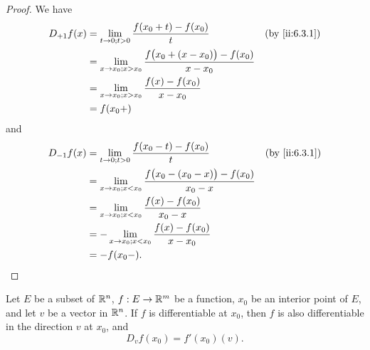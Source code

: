 \begin{proof}
  We have
  \begin{align*}
    D_{+1} f(x) & = \lim_{t \to 0 ; t > 0} \dfrac{f(x_0 + t) - f(x_0)}{t}                           &  & \by{ii:6.3.1} \\
                & = \lim_{x \to x_0 ; x > x_0} \dfrac{f\big(x_0 + (x - x_0)\big) - f(x_0)}{x - x_0}                    \\
                & = \lim_{x \to x_0 ; x > x_0} \dfrac{f(x) - f(x_0)}{x - x_0}                                          \\
                & = f(x_0+)
  \end{align*}
  and
  \begin{align*}
    D_{-1} f(x) & = \lim_{t \to 0 ; t > 0} \dfrac{f(x_0 - t) - f(x_0)}{t}                           &  & \by{ii:6.3.1} \\
                & = \lim_{x \to x_0 ; x < x_0} \dfrac{f\big(x_0 - (x_0 - x)\big) - f(x_0)}{x_0 - x}                    \\
                & = \lim_{x \to x_0 ; x < x_0} \dfrac{f(x) - f(x_0)}{x_0 - x}                                          \\
                & = -\lim_{x \to x_0 ; x < x_0} \dfrac{f(x) - f(x_0)}{x - x_0}                                         \\
                & = -f(x_0-).
  \end{align*}
\end{proof}

\setcounter{thm}{4}
\begin{lem}\label{ii:6.3.5}
  Let \(E\) be a subset of \(\mathbb{R}^n\), \(f : E \to \mathbb{R}^m\) be a function, \(x_0\) be an interior point of \(E\), and let \(v\) be a vector in \(\mathbb{R}^n\).
  If \(f\) is differentiable at \(x_0\), then \(f\) is also differentiable in the direction \(v\) at \(x_0\), and
  \[
    D_v f(x_0) = f'(x_0)(v).
  \]
\end{lem}

